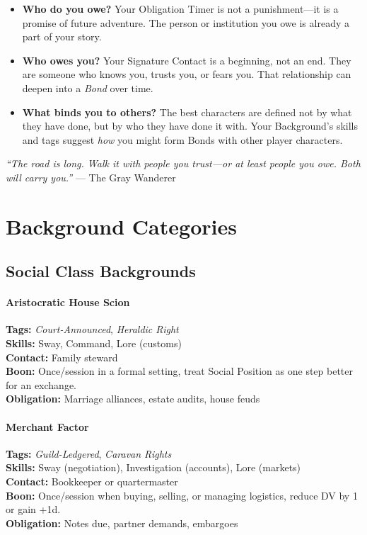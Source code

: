 \begin{itemize}
\item \textbf{Who do you owe?} Your Obligation Timer is not a punishment---it is a promise of future adventure. The person or institution you owe is already a part of your story.
\item \textbf{Who owes you?} Your Signature Contact is a beginning, not an end. They are someone who knows you, trusts you, or fears you. That relationship can deepen into a \emph{Bond} over time.
\item \textbf{What binds you to others?} The best characters are defined not by what they have done, but by who they have done it with. Your Background's skills and tags suggest \emph{how} you might form Bonds with other player characters.
\end{itemize}

\textit{``The road is long. Walk it with people you trust---or at least people you owe. Both will carry you.''} --- The Gray Wanderer

\section{Background Categories}

\subsection*{Social Class Backgrounds}

\paragraph{Aristocratic House Scion}
\textbf{Tags:} \textit{Court-Announced}, \textit{Heraldic Right} \\
\textbf{Skills:} Sway, Command, Lore (customs) \\
\textbf{Contact:} Family steward \\
\textbf{Boon:} Once/session in a formal setting, treat Social Position as one step better for an exchange. \\
\textbf{Obligation:} Marriage alliances, estate audits, house feuds

\paragraph{Merchant Factor}
\textbf{Tags:} \textit{Guild-Ledgered}, \textit{Caravan Rights} \\
\textbf{Skills:} Sway (negotiation), Investigation (accounts), Lore (markets) \\
\textbf{Contact:} Bookkeeper or quartermaster \\
\textbf{Boon:} Once/session when buying, selling, or managing logistics, reduce DV by 1 or gain +1d. \\
\textbf{Obligation:} Notes due, partner demands, embargoes

